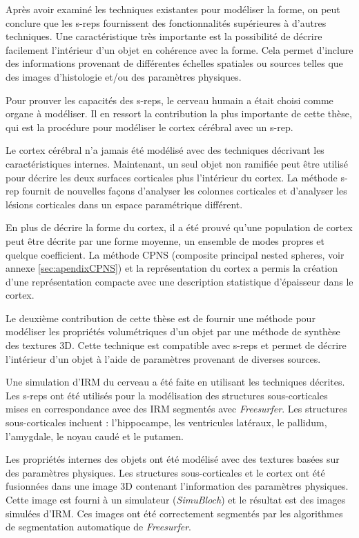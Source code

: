 Après avoir examiné les techniques existantes pour modéliser la forme, on peut conclure que 
les s-reps fournissent des fonctionnalités supérieures à d'autres techniques.
Une caractéristique très importante est la possibilité de décrire facilement l'intérieur d'un objet
en cohérence avec la forme.
Cela permet d'inclure des informations provenant de différentes échelles 
spatiales ou sources telles que des images d'histologie et/ou des paramètres physiques.

Pour prouver les capacités des s-reps, le cerveau humain a était choisi comme organe à modéliser.
Il en ressort la contribution la plus importante de cette thèse, 
qui est la procédure pour modéliser le cortex cérébral avec un s-rep.

Le cortex cérébral n'a jamais été modélisé avec des techniques décrivant les caractéristiques internes.
Maintenant, un seul objet non ramifiée peut être utilisé pour décrire les deux surfaces corticales plus l'intérieur du cortex.
La méthode s-rep fournit de nouvelles façons d'analyser 
les colonnes corticales et d'analyser les lésions corticales dans un espace paramétrique différent.

En plus de décrire la forme du cortex, il a été prouvé qu'une population de cortex peut 
être décrite par une forme moyenne, un ensemble de modes propres et quelque coefficient. 
La méthode CPNS (composite principal nested spheres, voir annexe \ref{sec:apendixCPNS}) 
et la représentation du cortex a permis la création d'une représentation compacte 
avec une description statistique d'épaisseur dans le cortex.

Le deuxième contribution de cette thèse est de fournir une méthode pour modéliser les propriétés volumétriques d'un objet
par une méthode de synthèse des textures 3D.
Cette technique est compatible avec s-reps et permet de décrire l'intérieur d'un objet à 
l'aide de paramètres provenant de diverses sources.

Une simulation d'IRM du cerveau a été faite en utilisant les techniques décrites.
Les s-reps ont été utilisés pour la modélisation des structures sous-corticales 
mises en correspondance avec des IRM segmentés avec \textit{Freesurfer}.
Les structures sous-corticales incluent : l'hippocampe, les ventricules latéraux, le pallidum, l'amygdale, le noyau caudé et le putamen.

Les propriétés internes des objets ont été modélisé avec des textures basées sur des paramètres physiques.
Les structures sous-corticales et le cortex ont été fusionnées dans une image 3D contenant l'information des paramètres physiques. 
Cette image est fourni à un simulateur (\textit{SimuBloch}) et le résultat est des images simulées d'IRM.
Ces images ont été correctement segmentés par les algorithmes de segmentation automatique de \textit{Freesurfer}.

